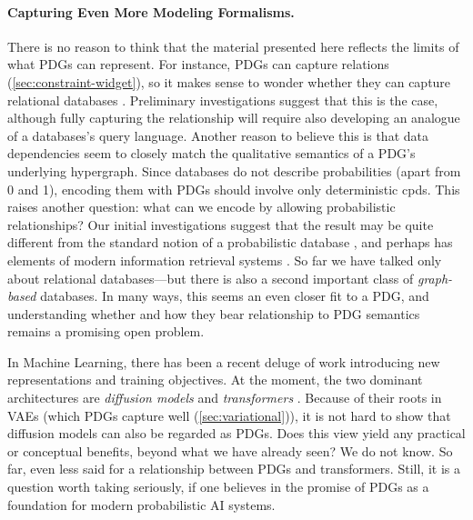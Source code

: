 \paragraph{Capturing Even More Modeling Formalisms.}
There is no reason to think that the material presented here reflects the limits of what PDGs can represent. 
%
For instance, PDGs can capture relations (\cref{sec:constraint-widget}), so it makes sense to wonder whether they can capture relational databases
    \citep{abiteboul1995foundations}. 
Preliminary investigations suggest that this is the case,
    although fully capturing the relationship will require also developing an analogue of a databases's query language.  
Another reason to believe this is that data dependencies \citep{fagin1986theory} seem to closely match the qualitative semantics of a PDG's underlying hypergraph. 
Since databases do not describe probabilities (apart from 0 and 1), 
    encoding them with PDGs should involve only deterministic cpds.
This raises another question: what can we encode by allowing probabilistic relationships?
Our initial investigations suggest that the result may be quite different from the standard notion of a probabilistic database \citep{suciu2011probabilistic}, and perhaps has elements of modern information retrieval systems \citep{mitra-neural-info-retrieval}.
%
So far we have talked only about relational databases---but there is also a second important class of \emph{graph-based} databases.
In many ways, this seems an even closer fit to a PDG, and understanding whether and how they bear relationship to PDG semantics remains a promising open problem. 

In Machine Learning, there has been a recent deluge of work introducing new representations and training objectives. At the moment, the two dominant architectures are \emph{diffusion models} \citep{pmlr-v37-sohl-dickstein15,ho2020denoising} and \emph{transformers} \citep{vaswani-attn}. 
Because of their roots in VAEs (which PDGs capture well (\cref{sec:variational})), it is not hard to show that diffusion models can also be regarded as PDGs. %
    Does this view yield any practical or conceptual benefits, beyond what we have already seen? 
    We do not know.
%
So far, even less said for a relationship between PDGs and transformers.
Still, it is a question worth taking seriously, if one believes in the promise of PDGs as a foundation for modern probabilistic AI systems.      


